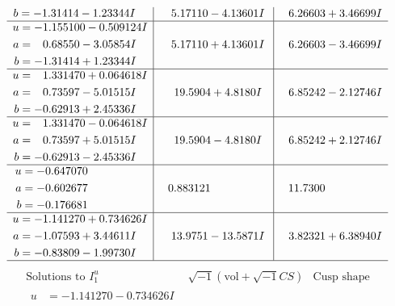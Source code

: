 \documentclass[1p]{elsarticle_modified}
\theoremstyle{definition}
\newcommand{\I}{\sqrt{-1}}
\begin{document}
$$\begin{array}{c|c|c}
\begin{aligned}
b &= -1.31414 - 1.23344 I\end{aligned}
 & \phantom{-}5.17110 - 4.13601 I & \phantom{-}6.26603 + 3.46699 I \\ \hline\begin{aligned}
u &= -1.155100 - 0.509124 I \\
a &= \phantom{-}0.68550 - 3.05854 I \\
b &= -1.31414 + 1.23344 I\end{aligned}
 & \phantom{-}5.17110 + 4.13601 I & \phantom{-}6.26603 - 3.46699 I \\ \hline\begin{aligned}
u &= \phantom{-}1.331470 + 0.064618 I \\
a &= \phantom{-}0.73597 - 5.01515 I \\
b &= -0.62913 + 2.45336 I\end{aligned}
 & \phantom{-}19.5904 + 4.8180 I & \phantom{-}6.85242 - 2.12746 I \\ \hline\begin{aligned}
u &= \phantom{-}1.331470 - 0.064618 I \\
a &= \phantom{-}0.73597 + 5.01515 I \\
b &= -0.62913 - 2.45336 I\end{aligned}
 & \phantom{-}19.5904 - 4.8180 I & \phantom{-}6.85242 + 2.12746 I \\ \hline\begin{aligned}
u &= -0.647070\phantom{ +0.000000I} \\
a &= -0.602677\phantom{ +0.000000I} \\
b &= -0.176681\phantom{ +0.000000I}\end{aligned}
 & \phantom{-}0.883121\phantom{ +0.000000I} & \phantom{-}11.7300\phantom{ +0.000000I} \\ \hline\begin{aligned}
u &= -1.141270 + 0.734626 I \\
a &= -1.07593 + 3.44611 I \\
b &= -0.83809 - 1.99730 I\end{aligned}
 & \phantom{-}13.9751 - 13.5871 I & \phantom{-}3.82321 + 6.38940 I\\
 \hline 
 \end{array}$$\newpage$$\begin{array}{c|c|c}  
\text{Solutions to }I^u_{1}& \I (\text{vol} + \sqrt{-1}CS) & \text{Cusp shape}\\
 \hline 
\begin{aligned}
u &= -1.141270 - 0.734626 I \\

\end{aligned}
\end{array}$$
\end{document}
